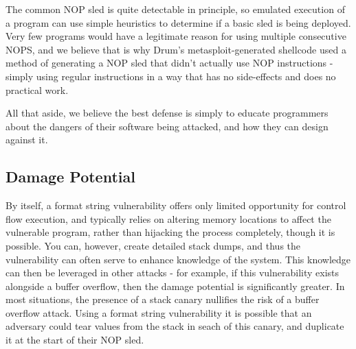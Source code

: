 The common NOP sled is quite detectable in principle, so emulated execution of a program can use simple heuristics to determine
if a basic sled is being deployed. Very few programs would have a legitimate reason for using multiple consecutive NOPS\cite{zip_quine},
and we believe that is why Drum's metasploit-generated shellcode used a method of generating a NOP sled that didn't actually
use NOP instructions - simply using regular instructions in a way that has no side-effects and does no practical work\cite{wiki_sled}.

All that aside, we believe the best defense is simply to educate programmers about the dangers of their software being attacked, and
how they can design against it.

\subsection{Damage Potential}

By itself, a format string vulnerability offers only limited opportunity for control flow execution, and typically
relies on altering memory locations to affect the vulnerable program, rather than hijacking the process completely, though it is possible. You
can, however, create detailed stack dumps, and thus the vulnerability can often serve to enhance knowledge of the
system. This knowledge can then be leveraged in other attacks - for example, if this vulnerability exists alongside a
buffer overflow, then the damage potential is significantly greater. In most situations, the presence of a stack canary
nullifies the risk of a buffer overflow attack. Using a format string vulnerability it is possible that an adversary
could tear values from the stack in seach of this canary, and duplicate it at the start of their NOP sled.
